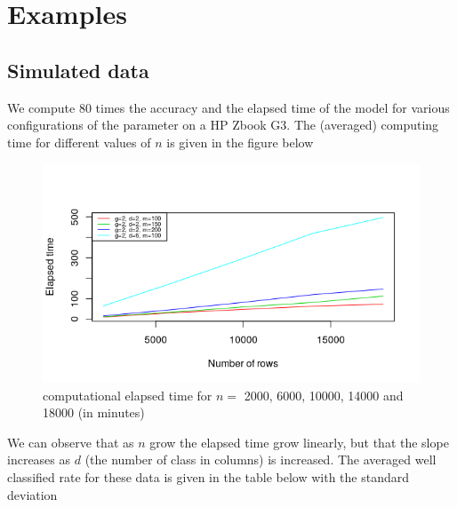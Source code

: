 \documentclass[a4paper]{article}
\begin{document}
\section{Examples}\label{sec:Applications}
  \subsection{Simulated data}\label{subsec:SimulatedData}
We compute 80 times the accuracy and the elapsed time of the model for various configurations of the parameter
on a HP Zbook G3. The (averaged) computing time for different values of $n$ is given in the figure below
\begin{figure}[H]%
\begin{center}
\includegraphics[width=12cm]{image_plots/times}
\end{center}
\caption{computational elapsed time for $n=$ 2000, 6000, 10000, 14000 and 18000 (in minutes)}
\label{fig:time}
\end{figure}
We can observe that as $n$ grow the elapsed time grow linearly, but that the slope increases as $d$ (the number
of class in columns) is increased.
The averaged well classified rate for these data is given in the table below with the standard deviation
\end{document}
